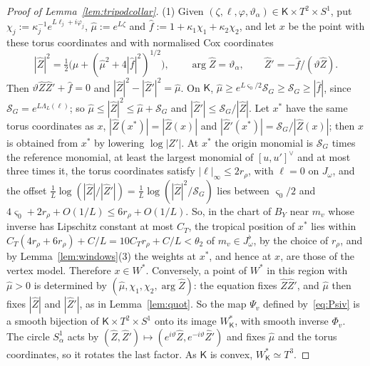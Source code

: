 \begin{proof}[Proof of Lemma~\ref{lem:tripodcollar}]
(1) Given $(\zeta,\ell,\varphi,\vartheta_\alpha)\in \mathsf K\times T^2\times S^1$, put $\chi_j:=\kappa_j^{-1}e^{L\ell_j+i\varphi_j}$,
$\hat\mu:=e^{L\zeta}$ and $\hat f:=1+\kappa_1\chi_1+\kappa_2\chi_2$, and let $x$ be the point with these torus coordinates and
with normalised Cox coordinates
\begin{equation}\label{eq:Psiv}
|\hat Z|^2=\tfrac12\bigl(\hat\mu+(\hat\mu^2+4|\hat f|^2)^{1/2}\bigr),\qquad\arg\hat Z=\vartheta_\alpha,\qquad\hat Z'=-\hat f/(\vartheta\hat Z).
\end{equation}
Then $\vartheta\hat Z\hat Z'+\hat f=0$ and $|\hat Z|^2-|\hat Z'|^2=\hat\mu$. On $\mathsf K$, $\hat\mu\ge e^{L\varsigma_0/2}\mathcal S_G\ge\mathcal
S_G\ge|\hat f|$, since $\mathcal S_G=e^{L\Lambda_L(\ell)}$; so $\hat\mu\le|\hat Z|^2\le\hat\mu+\mathcal S_G$ and
$|\hat Z'|\le\mathcal S_G/|\hat Z|$. Let $x^*$ have the same torus coordinates as $x$, $|\hat Z(x^*)|=|\hat Z(x)|$ and
$|\hat Z'(x^*)|=\mathcal S_G/|\hat Z(x)|$; then $x$ is obtained from $x^*$ by lowering $\log|Z'|$. At $x^*$ the origin
monomial is $\mathcal S_G$ times the reference monomial, at least the largest monomial of $[u,u']^\vee$ and at most three
times it, the torus coordinates satisfy $|\ell|_\infty\le2r_\rho$, with $\ell=0$ on $J_\omega$, and the offset
$\frac1L\log(|\hat Z|/|\hat Z'|)=\frac1L\log(|\hat Z|^2/\mathcal S_G)$ lies between $\varsigma_0/2$ and $4\varsigma_0+2r_\rho+O(1/L)\le
6r_\rho+O(1/L)$. So, in the chart of $B_Y$ near $m_v$ whose inverse has Lipschitz constant at most $C_T$, the tropical
position of $x^*$ lies within $C_T(4r_\rho+6r_\rho)+C/L=10C_Tr_\rho+C/L<\theta_2$ of $m_v\in J^\flat_\omega$, by the choice of
$r_\rho$, and by Lemma~\ref{lem:windows}(3) the weights at $x^*$, and hence at $x$, are those of the vertex model.
Therefore $x\in W^*$. Conversely, a point of $W^*$ in this region with $\hat\mu>0$ is determined by $(\hat\mu,\chi_1,\chi_2,\arg\hat
Z)$: the equation fixes $\hat Z\hat Z'$, and $\hat\mu$ then fixes $|\hat Z|$ and $|\hat Z'|$, as in Lemma~\ref{lem:quot}. So the
map $\Psi_v$ defined by~\eqref{eq:Psiv} is a smooth bijection of $\mathsf K\times T^2\times S^1$ onto its image $W^*_{\mathsf K}$, with smooth
inverse $\Phi_v$. The circle $S^1_\alpha$ acts by $(\hat Z,\hat Z')\mapsto(e^{i\vartheta}\hat Z,e^{-i\vartheta}\hat Z')$ and fixes
$\hat\mu$ and the torus coordinates, so it rotates the last factor. As $\mathsf K$ is convex, $W^*_{\mathsf K}\simeq T^3$.


\end{proof}
